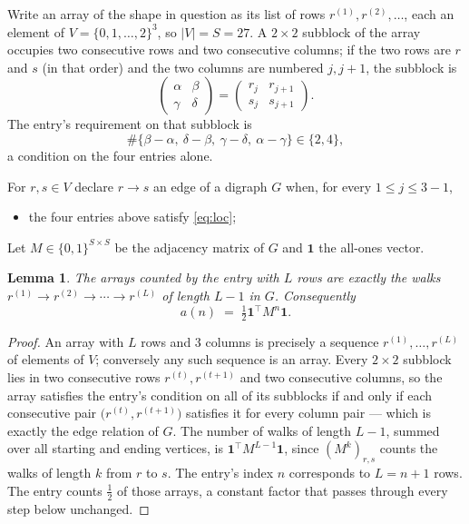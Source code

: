 \documentclass[11pt,a4paper]{article}
\theoremstyle{plain}
\newtheorem{lemma}[theorem]{Lemma}
\theoremstyle{definition}
\begin{document}
Write an array of the shape in question as its list of rows
$r^{(1)},r^{(2)},\dots$, each an element of
$V=\{0,1,\dots,2\}^{3}$, so $|V|=S=27$. A $2\times2$ subblock of the array
occupies two consecutive rows and two consecutive columns; if the two rows are $r$
and $s$ (in that order) and the two columns are numbered $j,j+1$,
the subblock is
\[
\begin{pmatrix}\alpha&\beta\\\gamma&\delta\end{pmatrix}=\begin{pmatrix}r_j&r_{j+1}\\s_j&s_{j+1}\end{pmatrix}.
\]
The entry's requirement on that subblock is
\begin{equation}\label{eq:loc}
\#\{\beta-\alpha,\ \delta-\beta,\ \gamma-\delta,\ \alpha-\gamma\}\in\{2,4\},
\end{equation}
a condition on the four entries alone.

For $r,s\in V$ declare $r\to s$ an edge of a digraph $G$ when, for every
$1\le j\le 3-1$,
\begin{itemize}
\item the four entries above satisfy \eqref{eq:loc};

\end{itemize}
Let $M\in\{0,1\}^{S\times S}$ be the adjacency matrix of $G$ and $\mathbf{1}$ the
all-ones vector.

\begin{lemma}\label{lem:walk}
The arrays counted by the entry with $L$ rows are exactly the walks
$r^{(1)}\to r^{(2)}\to\cdots\to r^{(L)}$ of length $L-1$ in $G$. Consequently
\[
a(n)\;=\;\tfrac1{2}\mathbf{1}^{\!\top}M^{n}\mathbf{1} .
\]
\end{lemma}

\begin{proof}
An array with $L$ rows and $3$ columns is precisely a sequence
$r^{(1)},\dots,r^{(L)}$ of elements of $V$; conversely any such sequence is an array.
Every $2\times2$ subblock lies in two consecutive rows $r^{(t)},r^{(t+1)}$ and two
consecutive columns, so the array satisfies the entry's condition on all of its subblocks
if and only if each consecutive pair $\bigl(r^{(t)},r^{(t+1)}\bigr)$ satisfies it for
every column pair --- which is exactly the edge relation of $G$. The number of walks of
length $L-1$, summed over all starting and ending vertices, is
$\mathbf{1}^{\!\top}M^{L-1}\mathbf{1}$, since $(M^{k})_{r,s}$ counts the walks of
length $k$ from $r$ to $s$. The entry's index $n$ corresponds to $L=n+1$ rows. The entry counts $\tfrac1{2}$ of those arrays, a constant factor that passes through every step below unchanged.
\end{proof}
\end{document}

